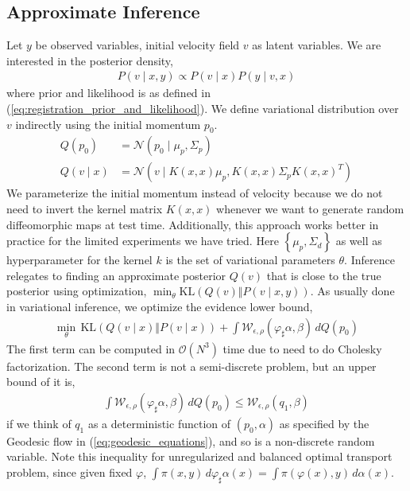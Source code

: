 \documentclass{6838publ}
\newcommand\sN{\ensuremath{\mathcal{N}}}
\newcommand\sO{\ensuremath{\mathcal{O}}}
\newcommand\sW{\ensuremath{\mathcal{W}}}
\newcommand\pc[1]{\ensuremath{\left\{ #1 \right\}}} %
\begin{document}
\subsection{Approximate Inference}

Let $y$ be observed variables, initial velocity field $v$ as latent variables. We are interested in the posterior density,
\begin{align}
    P(v\mid x, y) \propto P(v\mid x) P(y\mid v,x)
\end{align}
where prior and likelihood is as defined in (\ref{eq:registration_prior_and_likelihood}). We define variational distribution over $v$ indirectly using the initial momentum $p_0$.
\begin{align}
    Q(p_0)
        &= \sN(p_0\mid \mu_p, \Sigma_p) \\
    Q(v\mid x)
        &= \sN(v\mid K(x,x)\mu_p, K(x,x) \Sigma_p K(x,x)^T)
\end{align}
We parameterize the initial momentum instead of velocity because we do not need to invert the kernel matrix $K(x,x)$ whenever we want to generate random diffeomorphic maps at test time. Additionally, this approach works better in practice for the limited experiments we have tried. Here $\pc{\mu_p, \Sigma_d}$ as well as hyperparameter for the kernel $k$ is the set of variational parameters $\theta$. Inference relegates to finding an approximate posterior $Q(v)$ that is close to the true posterior using optimization, $\min_{\theta} \text{KL}(Q(v)\Vert P(v\mid x, y))$. As usually done in variational inference, we optimize the evidence lower bound,
\begin{align}
    \min_{\theta}\,
        \text{KL}(Q(v\mid x)\Vert P(v\mid x)) + \int \sW_{\epsilon,\rho}(\varphi_\sharp\alpha,\beta)\, dQ(p_0)
    \label{eq:opt_elbo}
\end{align}
The first term can be computed in $\sO(N^3)$ time due to need to do Cholesky factorization. The second term is not a semi-discrete problem, but an upper bound of it is,
\begin{align}
    \int \sW_{\epsilon,\rho}(\varphi_\sharp\alpha,\beta)\, dQ(p_0)
        \leq \sW_{\epsilon,\rho}( q_1 ,\beta )
\end{align}
if we think of $q_1$ as a deterministic function of $(p_0,\alpha)$ as specified by the Geodesic flow in (\ref{eq:geodesic_equations}), and so is a non-discrete random variable. Note this inequality for unregularized and balanced optimal transport problem, since given fixed $\varphi$, $\int \pi(x,y)\, d\varphi_\sharp\alpha(x) = \int \pi(\varphi(x),y) \, d\alpha(x)$.
\end{document}
